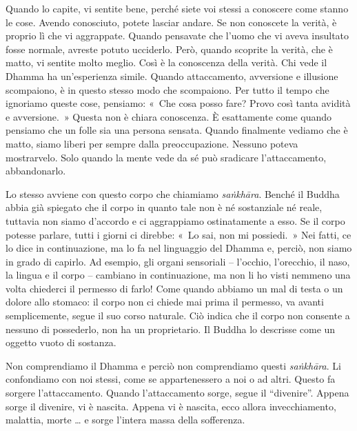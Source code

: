 Quando lo capite, vi sentite bene, perché siete voi stessi a conoscere
come stanno le cose. Avendo conosciuto, potete lasciar andare. Se non
conoscete la verità, è proprio lì che vi aggrappate. Quando pensavate
che l'uomo che vi aveva insultato fosse normale, avreste potuto
ucciderlo. Però, quando scoprite la verità, che è matto, vi sentite
molto meglio. Così è la conoscenza della verità. Chi vede il Dhamma ha
un'esperienza simile. Quando attaccamento, avversione e illusione
scompaiono, è in questo stesso modo che scompaiono. Per tutto il tempo
che ignoriamo queste cose, pensiamo: «~Che cosa posso fare? Provo così
tanta avidità e avversione.~» Questa non è chiara conoscenza. È
esattamente come quando pensiamo che un folle sia una persona sensata.
Quando finalmente vediamo che è matto, siamo liberi per sempre dalla
preoccupazione. Nessuno poteva mostrarvelo. Solo quando la mente vede da
sé può sradicare l'attaccamento, abbandonarlo.

Lo stesso avviene con questo corpo che chiamiamo \emph{saṅkhāra}. Benché
il Buddha abbia già spiegato che il corpo in quanto tale non è né
sostanziale né reale, tuttavia non siamo d'accordo e ci aggrappiamo
ostinatamente a esso. Se il corpo potesse parlare, tutti i giorni ci
direbbe: «~Lo sai, non mi possiedi.~» Nei fatti, ce lo dice in
continuazione, ma lo fa nel linguaggio del Dhamma e, perciò, non siamo
in grado di capirlo. Ad esempio, gli organi sensoriali -- l'occhio,
l'orecchio, il naso, la lingua e il corpo -- cambiano in continuazione,
ma non li ho visti nemmeno una volta chiederci il permesso di farlo!
Come quando abbiamo un mal di testa o un dolore allo stomaco: il corpo
non ci chiede mai prima il permesso, va avanti semplicemente, segue il
suo corso naturale. Ciò indica che il corpo non consente a nessuno di
possederlo, non ha un proprietario. Il Buddha lo descrisse come un
oggetto vuoto di sostanza.

Non comprendiamo il Dhamma e perciò non comprendiamo questi
\emph{saṅkhāra}. Li confondiamo con noi stessi, come se appartenessero a
noi o ad altri. Questo fa sorgere l'attaccamento. Quando l'attaccamento
sorge, segue il ``divenire''. Appena sorge il divenire, vi è nascita.
Appena vi è nascita, ecco allora invecchiamento, malattia, morte \ldots{} e
sorge l'intera massa della sofferenza.

